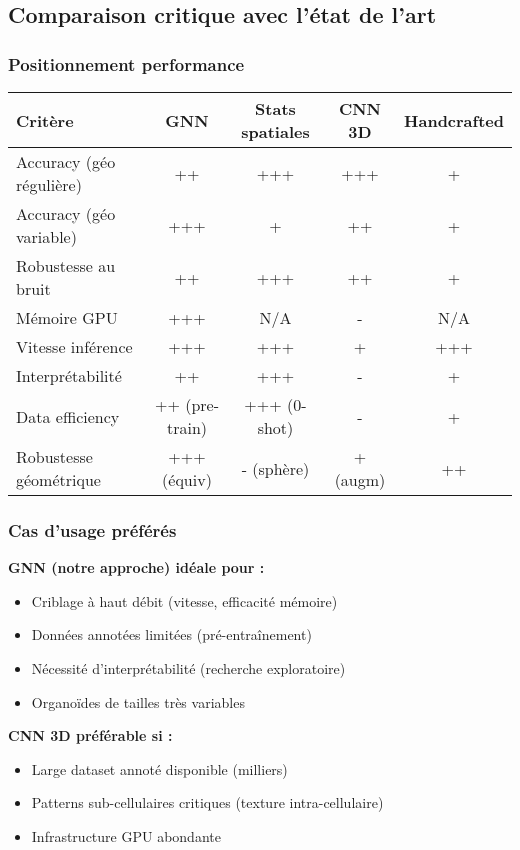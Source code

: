 \subsection{Comparaison critique avec l'état de l'art}

\subsubsection{Positionnement performance}

\begin{center}
\begin{tabular}{|l|c|c|c|c|}
\hline
\textbf{Critère} & \textbf{GNN} & \textbf{Stats spatiales} & \textbf{CNN 3D} & \textbf{Handcrafted} \\
\hline
Accuracy (géo régulière) & ++ & +++ & +++ & + \\
Accuracy (géo variable) & +++ & + & ++ & + \\
Robustesse au bruit & ++ & +++ & ++ & + \\
Mémoire GPU & +++ & N/A & - & N/A \\
Vitesse inférence & +++ & +++ & + & +++ \\
Interprétabilité & ++ & +++ & - & + \\
Data efficiency & ++ (pre-train) & +++ (0-shot) & - & + \\
Robustesse géométrique & +++ (équiv) & - (sphère) & + (augm) & ++ \\
\hline
\end{tabular}
\end{center}

\subsubsection{Cas d'usage préférés}

\textbf{GNN (notre approche) idéale pour :}
\begin{itemize}
    \item Criblage à haut débit (vitesse, efficacité mémoire)
    \item Données annotées limitées (pré-entraînement)
    \item Nécessité d'interprétabilité (recherche exploratoire)
    \item Organoïdes de tailles très variables
\end{itemize}

\textbf{CNN 3D préférable si :}
\begin{itemize}
    \item Large dataset annoté disponible (milliers)
    \item Patterns sub-cellulaires critiques (texture intra-cellulaire)
    \item Infrastructure GPU abondante
\end{itemize}

